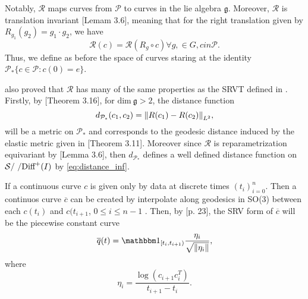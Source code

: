 Notably, \(\mathcal{R}\)  maps curves from \(\mathcal{\mathcal{P}}\) to curves in the lie algebra \(\mathfrak{g}\). Moreover, \(\mathcal{R}\) is translation invariant \cite{celledoni2016}[Lemam 3.6], meaning that for the right translation given by \(R_{g_1}(g_2) = g_1 \cdot g_2\),  we have 
\begin{equation*}
  \mathcal{R}(c) = \mathcal{R}(R_g \circ c) \forall g, \in G, c in \mathcal{P}.
\end{equation*}
Thus, we define as before the space of curves staring at the identity \(\mathcal{P}_* \{c \in \mathcal{P} : c(0)=e\}\).  

\citeauthor{celledoni2016}  also proved that \(\mathcal{R}\) has many of the same properties as the SRVT defined in \cite{srivastava2011_srvt}. Firstly, by \cite{celledoni2016}[Theorem 3.16], for \(\text{dim} \ \mathfrak{g} > 2\), the distance function 
\begin{equation*}
  d_{\mathcal{P}_*}(c_1, c_2) = \norm{R(c_1) - R(c_2)}_{L^2}, 
\end{equation*}
will be a metric on \(\mathcal{P}_*\) and corresponds to the geodesic distance induced by the elastic metric given in \cite{celledoni2016}[Theorem 3.11]. Moreover since \(\mathcal{R}\) is reparametrization equivariant by \cite{celledoni2016}[Lemma 3.6], then \(d_{\mathcal{P}_*}\) defines a well defined distance function on \(\mathcal{S} / \ / \text{Diff}^+(I)\) by \eqref{eq:distance_inf}. 

If a continuous curve \(c\) is given only by data at discrete times \((t_i)_{i=0}^n\). Then a continuos curve \(\overline{c}\) can be created by interpolate along geodesics in SO(3) between each \(c(t_i)\) and \(c(t_{i+1}\), \(0 \leq i \leq n-1\) \cite{geodesic_interpl}.  Then, by \cite{celledoni2016}[p. 23], the SRV form of \(\overline{c}\) will be the piecewise constant curve 
\begin{equation*}
  \overline q(t) = \one_{[t_i, t_{i+1})}\frac{\eta_i}{\sqrt{\norm{\eta_i}}},
\end{equation*}
where
\begin{equation*}
  \eta_i = \frac{\log(c_{i+1}c_{i}^T)}{t_{i+1} -  t_{i}}.
\end{equation*}
